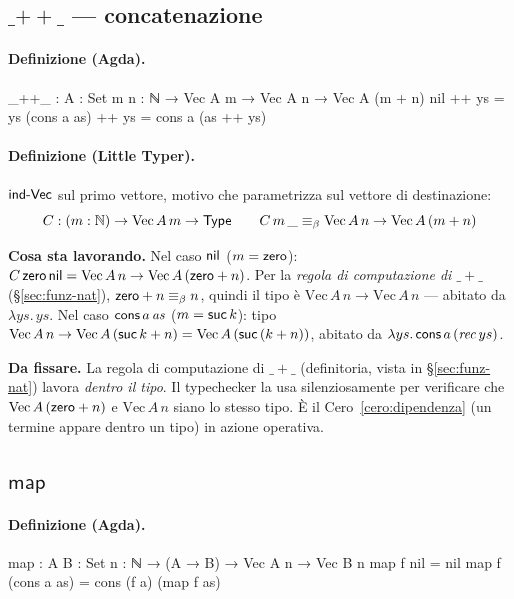 \subsection*{$\_\mathbin{+\!\!+}\_$ --- concatenazione}

\paragraph{Definizione (Agda).}
\begin{agda}
_++_ : {A : Set} {m n : ℕ} → Vec A m → Vec A n → Vec A (m + n)
nil         ++ ys = ys
(cons a as) ++ ys = cons a (as ++ ys)
\end{agda}

\paragraph{Definizione (Little Typer).} $\mathsf{ind\text{-}Vec}$ sul primo vettore, motivo che parametrizza sul vettore di destinazione:
\[
C : (m : \mathbb{N}) \to \mathrm{Vec}\,A\,m \to \mathsf{Type}
\qquad
C\,m\,\_ \equiv_{\beta} \mathrm{Vec}\,A\,n \to \mathrm{Vec}\,A\,(m + n)
\]

\noindent\textbf{Cosa sta lavorando.} Nel caso $\mathsf{nil}$ ($m = \mathsf{zero}$): $C\,\mathsf{zero}\,\mathsf{nil} = \mathrm{Vec}\,A\,n \to \mathrm{Vec}\,A\,(\mathsf{zero} + n)$. Per la \emph{regola di computazione di $\_+\_$} (\S\ref{sec:funz-nat}), $\mathsf{zero} + n \equiv_{\beta} n$, quindi il tipo \`e $\mathrm{Vec}\,A\,n \to \mathrm{Vec}\,A\,n$ --- abitato da $\lambda ys.\,ys$. Nel caso $\mathsf{cons}\,a\,\mathit{as}$ ($m = \mathsf{suc}\,k$): tipo $\mathrm{Vec}\,A\,n \to \mathrm{Vec}\,A\,(\mathsf{suc}\,k + n) = \mathrm{Vec}\,A\,(\mathsf{suc}\,(k+n))$, abitato da $\lambda ys.\,\mathsf{cons}\,a\,(\mathit{rec}\,ys)$.

\medskip

\noindent\textbf{Da fissare.} La regola di computazione di $\_+\_$ (definitoria, vista in \S\ref{sec:funz-nat}) lavora \emph{dentro il tipo}. Il typechecker la usa silenziosamente per verificare che $\mathrm{Vec}\,A\,(\mathsf{zero} + n)$ e $\mathrm{Vec}\,A\,n$ siano lo stesso tipo. \`E il Cero~\ref{cero:dipendenza} (un termine appare dentro un tipo) in azione operativa.

\subsection*{$\mathsf{map}$}

\paragraph{Definizione (Agda).}
\begin{agda}
map : {A B : Set} {n : ℕ} → (A → B) → Vec A n → Vec B n
map f nil         = nil
map f (cons a as) = cons (f a) (map f as)
\end{agda}

